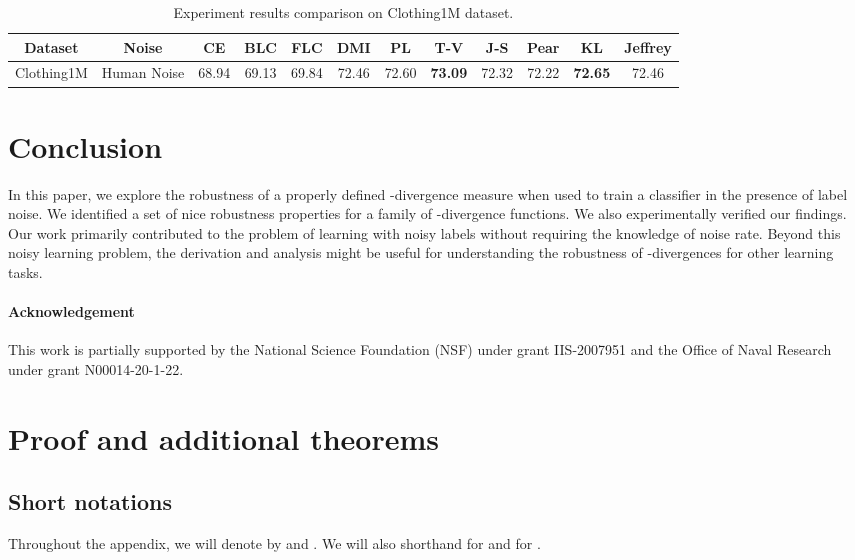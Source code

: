 \documentclass{article}
\begin{document}
\begin{table*}[!ht]
\scriptsize
\centering
\begin{threeparttable}
\begin{tabular}{c|c|c|c|c|c|c|c|c|c|c|c}
\hline
Dataset & Noise & CE & BLC & FLC & DMI& PL & T-V & J-S & Pear  & KL & Jeffrey \\ \hline\hline
\multirow{1}{*}{Clothing1M}
& Human Noise & 68.94 & 69.13 & 69.84 & 72.46  & 72.60  & {\color{blue}\textbf{73.09}} & 72.32 &  72.22 & {\color{blue}\textbf{72.65}}  & 72.46
\\ \cline{2-12}
\hline
\end{tabular}
\end{threeparttable}
\caption{Experiment results comparison on Clothing1M dataset.
}
\label{Tab:Experiment_Results_C1M}
\end{table*}
 
\section{Conclusion}
In this paper, we explore the robustness of a properly defined -divergence measure when used to train a classifier in the presence of label noise.
We identified a set of nice robustness properties for a family of -divergence functions. We also experimentally verified our findings. Our work primarily contributed to the problem of learning with noisy labels without requiring the knowledge of noise rate. Beyond this noisy learning problem, the derivation and analysis might be useful for understanding the robustness of -divergences for other learning tasks. 

\paragraph{Acknowledgement} This work is partially supported by the National Science Foundation (NSF) under grant IIS-2007951 and the Office of Naval Research under grant
N00014-20-1-22.

\newpage



\newpage
\appendix

\section{Proof and additional theorems}
\subsection{Short notations}
Throughout the appendix, we will denote by  and . We will also shorthand  for  and  for .
\end{document}
